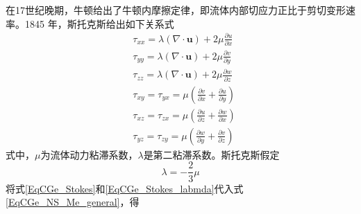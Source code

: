 在17世纪晚期，牛顿给出了牛顿内摩擦定律，即流体内部切应力正比于剪切变形速率。1845
年，斯托克斯给出如下关系式
\begin{equation}
  \begin{aligned}
  &\tau_{xx} = \lambda(\nabla\cdot\mathbf{u}) + 2\mu\frac{\partial u}{\partial x}
\\&
\tau_{yy} = \lambda(\nabla\cdot\mathbf{u}) + 2\mu\frac{\partial v}{\partial y}
\\&
\tau_{zz} = \lambda(\nabla\cdot\mathbf{u}) + 2\mu\frac{\partial w}{\partial z}
\\&
\tau_{xy} = \tau_{yx} =
\mu
\left(
  \frac{\partial v}{\partial x}+\frac{\partial u}{\partial y}
\right)
\\&
\tau_{xz} = \tau_{zx} =
\mu
\left(
  \frac{\partial u}{\partial z}+\frac{\partial w}{\partial x}
\right)
\\&
\tau_{yz} = \tau_{zy} =
\mu
\left(
  \frac{\partial w}{\partial y}+\frac{\partial v}{\partial z}
\right)
  \end{aligned}
  \label{EqCGe_Stokes}
\end{equation}
式中，$\mu$为流体动力粘滞系数，$\lambda$是第二粘滞系数。斯托克斯假定
\begin{equation}
  \lambda = -\frac{2}{3}\mu
  \label{EqCGe_Stokes_labmda}
\end{equation}
将式\eqref{EqCGe_Stokes}和\eqref{EqCGe_Stokes_labmda}代入式
\eqref{EqCGe_NS_Me_general}，得
